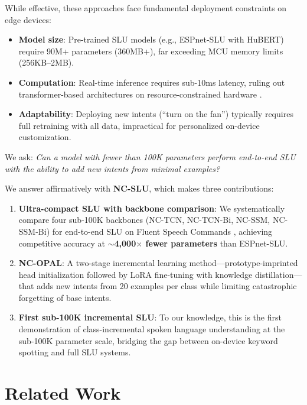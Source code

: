 \documentclass[11pt]{article}
\begin{document}
While effective, these approaches face fundamental deployment constraints on edge devices:
\begin{itemize}
\setlength\itemsep{1pt}
\item \textbf{Model size}: Pre-trained SLU models (e.g., ESPnet-SLU with HuBERT) require 90M+ parameters (360MB+), far exceeding MCU memory limits (256KB--2MB).
\item \textbf{Computation}: Real-time inference requires sub-10ms latency, ruling out transformer-based architectures on resource-constrained hardware \cite{banbury2021mlperf}.
\item \textbf{Adaptability}: Deploying new intents (``turn on the fan'') typically requires full retraining with all data, impractical for personalized on-device customization.
\end{itemize}

We ask: \emph{Can a model with fewer than 100K parameters perform end-to-end SLU with the ability to add new intents from minimal examples?}

We answer affirmatively with \textbf{NC-SLU}, which makes three contributions:

\begin{enumerate}
\setlength\itemsep{1pt}
\item \textbf{Ultra-compact SLU with backbone comparison}: We systematically compare four sub-100K backbones (NC-TCN, NC-TCN-Bi, NC-SSM, NC-SSM-Bi) for end-to-end SLU on Fluent Speech Commands \cite{lugosch2019speech}, achieving competitive accuracy at $\sim$\textbf{4,000$\times$ fewer parameters} than ESPnet-SLU.

\item \textbf{NC-OPAL}: A two-stage incremental learning method---prototype-imprinted head initialization followed by LoRA fine-tuning with knowledge distillation---that adds new intents from 20 examples per class while limiting catastrophic forgetting of base intents.

\item \textbf{First sub-100K incremental SLU}: To our knowledge, this is the first demonstration of class-incremental spoken language understanding at the sub-100K parameter scale, bridging the gap between on-device keyword spotting and full SLU systems.
\end{enumerate}

\section{Related Work}
\end{document}

